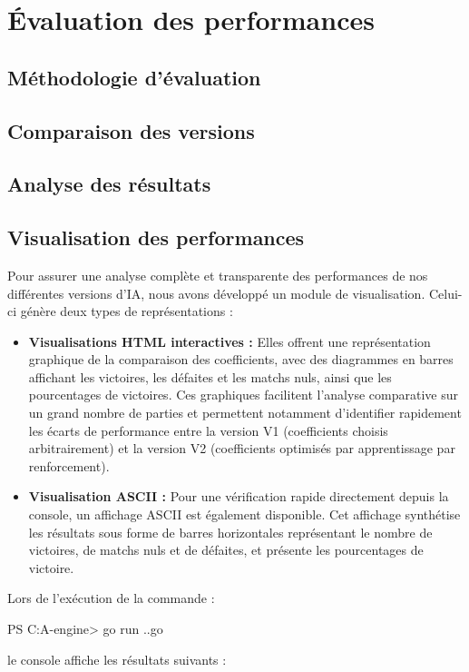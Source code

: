 \documentclass[a4paper,12pt]{article}
\begin{document}
\section{Évaluation des performances}
\subsection{Méthodologie d'évaluation}
\subsection{Comparaison des versions}
\subsection{Analyse des résultats}
\subsection{Visualisation des performances}
Pour assurer une analyse complète et transparente des performances de nos différentes versions d'IA, nous avons développé un module de visualisation. Celui-ci génère deux types de représentations :

\begin{itemize}
    \item \textbf{Visualisations HTML interactives :} Elles offrent une représentation graphique de la comparaison des coefficients, avec des diagrammes en barres affichant les victoires, les défaites et les matchs nuls, ainsi que les pourcentages de victoires. Ces graphiques facilitent l'analyse comparative sur un grand nombre de parties et permettent notamment d'identifier rapidement les écarts de performance entre la version V1 (coefficients choisis arbitrairement) et la version V2 (coefficients optimisés par apprentissage par renforcement).
    \item \textbf{Visualisation ASCII :} Pour une vérification rapide directement depuis la console, un affichage ASCII est également disponible. Cet affichage synthétise les résultats sous forme de barres horizontales représentant le nombre de victoires, de matchs nuls et de défaites, et présente les pourcentages de victoire.
\end{itemize}

Lors de l'exécution de la commande :

PS C:\Users\axell\Documents\INSA\4A\IA\othello-engine> go run .\cmd\visualization\main.go

le console affiche les résultats suivants :
\end{document}
